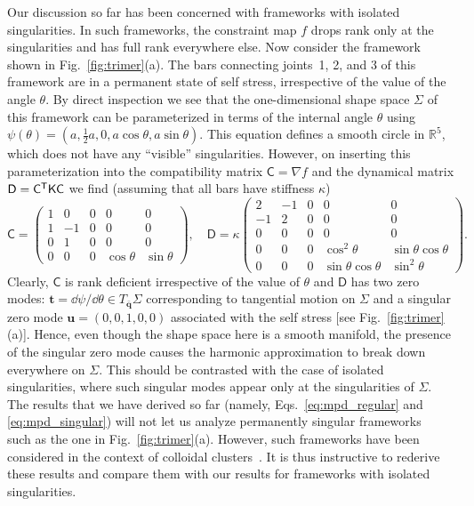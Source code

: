 Our discussion so far has been concerned with frameworks with isolated singularities.
In such frameworks, the constraint map $f$ drops rank only at the singularities and has full rank everywhere else.
Now consider the framework shown in Fig.~\ref{fig:trimer}(a).
The bars connecting joints~1, 2, and 3 of this framework are in a permanent state of self stress, irrespective of the value of the angle $\theta$.
By direct inspection we see that the one-dimensional shape space $\Sigma$ of this framework can be parameterized in terms of the internal angle $\theta$ using $\psi(\theta) = (a, \tfrac{1}{2}a, 0, a\cos{\theta}, a\sin{\theta})$.
This equation defines a smooth circle in $\mathbb{R}^{5}$, which does not have any ``visible'' singularities.
However, on inserting this parameterization into the compatibility matrix $\mathsf{C} = \nabla f$ and the dynamical matrix $\mathsf{D} = \mathsf{C}^\mathsf{T}\mathsf{K}\mathsf{C}$ we find (assuming that all bars have stiffness $\kappa$)
%
\begin{equation}
  \mathsf{C} =
  \begin{pmatrix}
    1 & 0 & 0 & 0 & 0 \\
    1 & -1 & 0 & 0 & 0 \\
    0 & 1 & 0 & 0 & 0 \\
    0 & 0 & 0 & \cos \theta & \sin \theta
  \end{pmatrix},
  \quad
  \mathsf{D} =
  \kappa
  \begin{pmatrix}
    2 & -1 & 0 & 0 & 0 \\
    -1 & 2 & 0 & 0 & 0 \\
    0 & 0 & 0 & 0 & 0 \\
    0 & 0 & 0 & \cos ^2\theta & \sin \theta  \cos \theta \\
    0 & 0 & 0 & \sin \theta \cos \theta & \sin ^2\theta
  \end{pmatrix}.
\end{equation}
%
Clearly, $\mathsf{C}$ is rank deficient irrespective of the value of $\theta$ and $\mathsf{D}$ has two zero modes: $\bm{t} = \dd\psi/\dd\theta \in T_{\bar{\bm{q}}}\Sigma$ corresponding to tangential motion on $\Sigma$ and a singular zero mode $\bm{u} = (0, 0, 1, 0, 0)$ associated with the self stress [see Fig.~\ref{fig:trimer}(a)].
Hence, even though the shape space here is a smooth manifold, the presence of the singular zero mode causes the harmonic approximation to break down everywhere on $\Sigma$.
This should be contrasted with the case of isolated singularities, where such singular modes appear only at the singularities of $\Sigma$.
The results that we have derived so far (namely, Eqs.~\ref{eq:mpd_regular} and \ref{eq:mpd_singular}) will not let us analyze permanently singular frameworks~\cite{muller2019,wu2020} such as the one in Fig.~\ref{fig:trimer}(a).
However, such frameworks have been considered in the context of colloidal clusters~\cite{kallus2017}.
It is thus instructive to rederive these results and compare them with our results for frameworks with isolated singularities.


